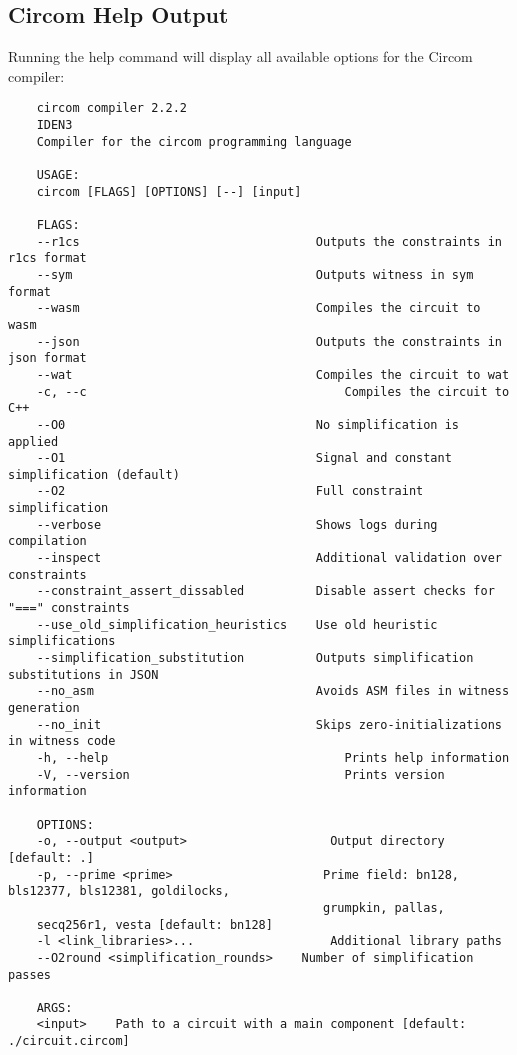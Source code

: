 \documentclass{article}
\begin{document}
\subsection{Circom Help Output}

Running the help command will display all available options for the Circom compiler:

\begin{verbatim}
	circom compiler 2.2.2
	IDEN3
	Compiler for the circom programming language
	
	USAGE:
	circom [FLAGS] [OPTIONS] [--] [input]
	
	FLAGS:
	--r1cs                                 Outputs the constraints in r1cs format
	--sym                                  Outputs witness in sym format
	--wasm                                 Compiles the circuit to wasm
	--json                                 Outputs the constraints in json format
	--wat                                  Compiles the circuit to wat
	-c, --c                                    Compiles the circuit to C++
	--O0                                   No simplification is applied
	--O1                                   Signal and constant simplification (default)
	--O2                                   Full constraint simplification
	--verbose                              Shows logs during compilation
	--inspect                              Additional validation over constraints
	--constraint_assert_dissabled          Disable assert checks for "===" constraints
	--use_old_simplification_heuristics    Use old heuristic simplifications
	--simplification_substitution          Outputs simplification substitutions in JSON
	--no_asm                               Avoids ASM files in witness generation
	--no_init                              Skips zero-initializations in witness code
	-h, --help                                 Prints help information
	-V, --version                              Prints version information
	
	OPTIONS:
	-o, --output <output>                    Output directory [default: .]
	-p, --prime <prime>                     Prime field: bn128, bls12377, bls12381, goldilocks,
	                                        grumpkin, pallas,
	secq256r1, vesta [default: bn128]
	-l <link_libraries>...                   Additional library paths
	--O2round <simplification_rounds>    Number of simplification passes
	
	ARGS:
	<input>    Path to a circuit with a main component [default: ./circuit.circom]
\end{verbatim}
\end{document}
